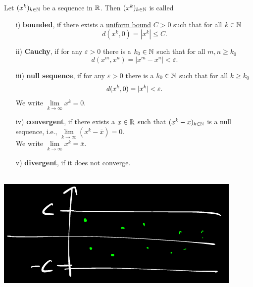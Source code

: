 \begin{frame}
\begin{defi}
Let $(x^k)_{k\in {\mathbb{N}}}$ be a sequence in ${\mathbb{R}}$. Then $(x^k)_{k\in {\mathbb{N}}}$ is called \vspace{0.2cm}\\
\begin{minipage}[t]{0.7\textwidth}
\begin{itemize}	
	\item[i)] \textbf{bounded}, if there exists a \underline{uniform bound} $C>0$ such that for all $k\in {\mathbb{N}}$
	$$d(x^k,0)=|x^k| \leq C .$$ \vspace{0.2cm}
	\item[ii)] \textbf{Cauchy}, if for any $\varepsilon>0$ there is a $k_0\in{\mathbb{N}}$ such that for all $m,n \geq k_0$
	$$d(x^m,x^n)=|x^m-x^n|<\varepsilon.$$ \vspace{0.2cm}
	\item[iii)] \textbf{null sequence}, if for any $\varepsilon>0$ there is a $k_0\in{\mathbb{N}}$ such that for all $k\geq k_0$
	$$d(x^k,0)=|x^k|<\varepsilon.\vspace{0.2cm}$$ We write $\lim\limits_{k\to\infty}x^k=0$.\vspace{0.2cm}
	\item[iv)]  \textbf{convergent}, if there exists a $\bar{x}\in{\mathbb{R}}$ such that $ (x^k-\bar{x})_{k \in {\mathbb{N}}}$ is a null sequence, i.e., $\lim\limits_{k\to\infty}(x^k-\bar{x})=0$.\\ We write $\lim\limits_{k\to\infty}x^k=\bar{x}$.\vspace{0.2cm}
	\item[v)] \textbf{divergent}, if it does not converge.
\end{itemize}
\end{minipage}
\begin{minipage}[t]{0.3\textwidth}
	~\\
 \includegraphics[width=0.9\textwidth]{./media/sequence-bounded}\\~\\

\end{minipage}
\end{defi}
\end{frame}
